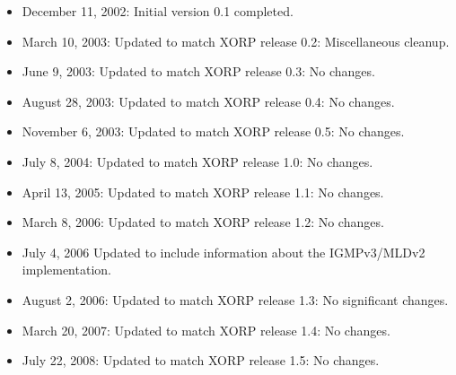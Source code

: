 \documentclass[11pt]{article}
\begin{document}
\begin{itemize}

  \item December 11, 2002: Initial version 0.1 completed.

  \item March 10, 2003: Updated to match XORP release 0.2:
   Miscellaneous cleanup.

  \item June 9, 2003: Updated to match XORP release 0.3:
   No changes.

  \item August 28, 2003: Updated to match XORP release 0.4:
   No changes.

  \item November 6, 2003: Updated to match XORP release 0.5:
   No changes.

  \item July 8, 2004: Updated to match XORP release 1.0:
   No changes.

  \item April 13, 2005: Updated to match XORP release 1.1:
   No changes.

  \item March 8, 2006: Updated to match XORP release 1.2:
   No changes.

  \item July 4, 2006 Updated to include information about the IGMPv3/MLDv2
   implementation.

  \item August 2, 2006: Updated to match XORP release 1.3:
   No significant changes.

  \item March 20, 2007: Updated to match XORP release 1.4:
   No changes.

  \item July 22, 2008: Updated to match XORP release 1.5:
   No changes.

\end{itemize}





\end{document}
